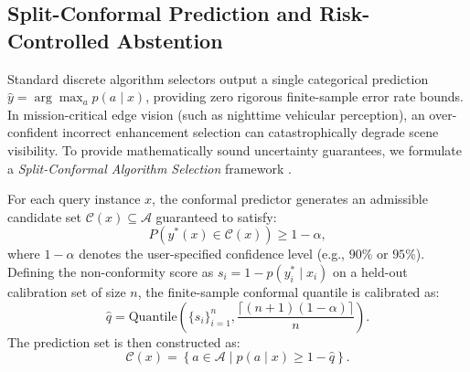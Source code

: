 \documentclass[journal]{IEEEtran}
\begin{document}
\subsection{Split-Conformal Prediction and Risk-Controlled Abstention}
Standard discrete algorithm selectors output a single categorical prediction $\hat{y} = \arg\max_a p(a \mid x)$, providing zero rigorous finite-sample error rate bounds. In mission-critical edge vision (such as nighttime vehicular perception), an over-confident incorrect enhancement selection can catastrophically degrade scene visibility. To provide mathematically sound uncertainty guarantees, we formulate a \textit{Split-Conformal Algorithm Selection} framework \cite{vovk2005algorithmic, angelopoulos2021gentle}.

For each query instance $x$, the conformal predictor generates an admissible candidate set $\mathcal{C}(x) \subseteq \mathcal{A}$ guaranteed to satisfy:
\begin{equation}
P\left(y^*(x) \in \mathcal{C}(x)\right) \ge 1 - \alpha,
\label{eq:conformal_guarantee}
\end{equation}
where $1 - \alpha$ denotes the user-specified confidence level (e.g., $90\%$ or $95\%$). Defining the non-conformity score as $s_i = 1 - p(y_i^* \mid x_i)$ on a held-out calibration set of size $n$, the finite-sample conformal quantile is calibrated as:
\begin{equation}
\hat{q} = \text{Quantile}\left(\{s_i\}_{i=1}^n, \frac{\lceil (n+1)(1-\alpha) \rceil}{n}\right).
\end{equation}
The prediction set is then constructed as:
\begin{equation}
\mathcal{C}(x) = \left\{ a \in \mathcal{A} \mid p(a \mid x) \ge 1 - \hat{q} \right\}.
\end{equation}
\end{document}
